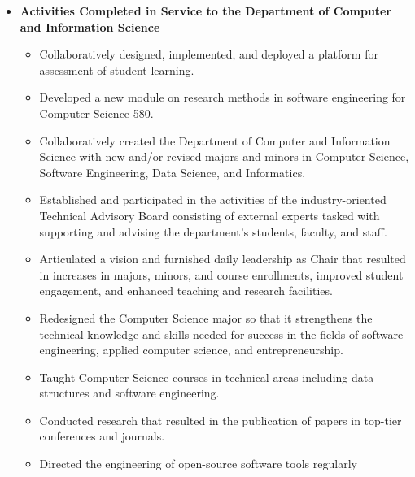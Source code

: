 \documentclass[11pt,letterpaper,sans]{moderncv}
\begin{document}
 {
  \begin{itemize} \renewcommand\labelitemi{\Large\textbullet}
    \item \textbf{Activities Completed in Service to the Department of Computer
      and Information Science}
      \begin{itemize} \renewcommand\labelitemi{\Large\textbullet}
        \item Collaboratively designed, implemented, and deployed a
          platform for assessment of student learning.
        \item Developed a new module on research methods in software
          engineering for Computer Science 580.
        \item Collaboratively created the Department of Computer and Information
          Science with new and/or revised majors and minors in Computer Science,
          Software Engineering, Data Science, and Informatics.
        \item Established and participated in the activities of the
          industry-oriented Technical Advisory Board consisting of external
          experts tasked with supporting and advising the department's students,
          faculty, and staff.
        \item Articulated a vision and furnished daily leadership as Chair that
          resulted in increases in majors, minors, and course enrollments,
          improved student engagement, and enhanced teaching and research
          facilities.
        \item Redesigned the Computer Science major so that it strengthens the
          technical knowledge and skills needed for success in the fields of
          software engineering, applied computer science, and entrepreneurship.
        \item Taught Computer Science courses in technical areas including data
          structures and software engineering.
        \item Conducted research that resulted in the publication of papers in
          top-tier conferences and journals.
        \item Directed the engineering of open-source software tools regularly

\end{itemize}
\end{itemize}}
\end{document}
